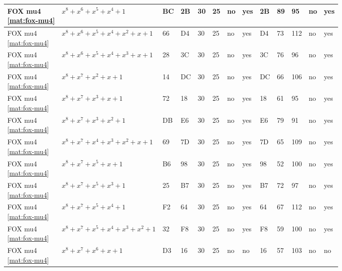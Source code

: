 \begin{tiny}
\begin{longtable}{|l|l|l|l|l|l|l|l|l|l|l|l|l|}
\shortstack{FOX mu4 \\ \eqref{mat:fox-mu4}} & $x^8 + x^6 + x^5 + x^4 + 1$ & BC & 2B & 30 & 25 & no & yes & 2B & 89 & 95 & no & yes \\ \hline
\shortstack{FOX mu4 \\ \eqref{mat:fox-mu4}} & $x^8 + x^6 + x^5 + x^4 + x^2 + x + 1$ & 66 & D4 & 30 & 25 & no & yes & D4 & 73 & 112 & no & yes \\ \hline
\shortstack{FOX mu4 \\ \eqref{mat:fox-mu4}} & $x^8 + x^6 + x^5 + x^4 + x^3 + x + 1$ & 28 & 3C & 30 & 25 & no & yes & 3C & 76 & 96 & no & yes \\ \hline
\shortstack{FOX mu4 \\ \eqref{mat:fox-mu4}} & $x^8 + x^7 + x^2 + x + 1$ & 14 & DC & 30 & 25 & no & yes & DC & 66 & 106 & no & yes \\ \hline
\shortstack{FOX mu4 \\ \eqref{mat:fox-mu4}} & $x^8 + x^7 + x^3 + x + 1$ & 72 & 18 & 30 & 25 & no & yes & 18 & 61 & 95 & no & yes \\ \hline
\shortstack{FOX mu4 \\ \eqref{mat:fox-mu4}} & $x^8 + x^7 + x^3 + x^2 + 1$ & DB & E6 & 30 & 25 & no & yes & E6 & 79 & 91 & no & yes \\ \hline
\shortstack{FOX mu4 \\ \eqref{mat:fox-mu4}} & $x^8 + x^7 + x^4 + x^3 + x^2 + x + 1$ & 69 & 7D & 30 & 25 & no & yes & 7D & 65 & 109 & no & yes \\ \hline
\shortstack{FOX mu4 \\ \eqref{mat:fox-mu4}} & $x^8 + x^7 + x^5 + x + 1$ & B6 & 98 & 30 & 25 & no & yes & 98 & 52 & 100 & no & yes \\ \hline
\shortstack{FOX mu4 \\ \eqref{mat:fox-mu4}} & $x^8 + x^7 + x^5 + x^3 + 1$ & 25 & B7 & 30 & 25 & no & yes & B7 & 72 & 97 & no & yes \\ \hline
\shortstack{FOX mu4 \\ \eqref{mat:fox-mu4}} & $x^8 + x^7 + x^5 + x^4 + 1$ & F2 & 64 & 30 & 25 & no & yes & 64 & 67 & 112 & no & yes \\ \hline
\shortstack{FOX mu4 \\ \eqref{mat:fox-mu4}} & $x^8 + x^7 + x^5 + x^4 + x^3 + x^2 + 1$ & 32 & F8 & 30 & 25 & no & yes & F8 & 59 & 100 & no & yes \\ \hline
\shortstack{FOX mu4 \\ \eqref{mat:fox-mu4}} & $x^8 + x^7 + x^6 + x + 1$ & D3 & 16 & 30 & 25 & no & no & 16 & 57 & 103 & no & no \\ \hline

\end{longtable}
\end{tiny}
